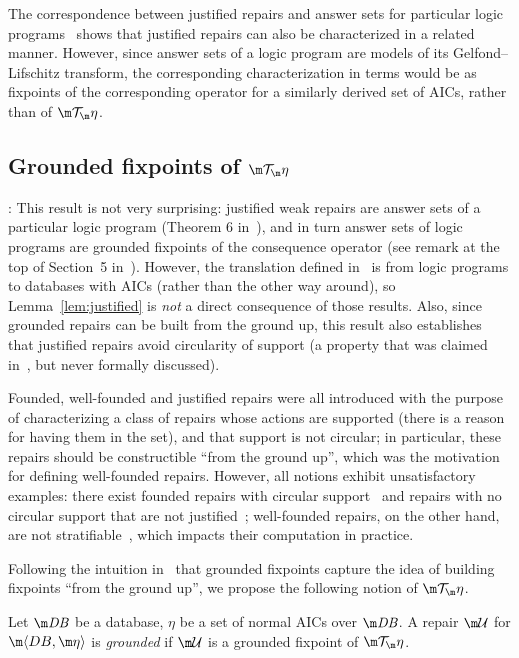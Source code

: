 The correspondence between justified repairs and answer sets for particular logic programs~\cite{Caroprese2011} shows that justified repairs can also be characterized in a related manner.
However, since answer sets of a logic program are models of its Gelfond--Lifschitz transform, the corresponding characterization in terms would be as fixpoints of the corresponding operator for a similarly derived set of AICs, rather than of $\Op$.

\subsection{Grounded fixpoints of $\Op$}

:
This result is not very surprising: justified weak repairs are answer sets of a particular logic program (Theorem 6 in~\cite{Caroprese2011}), and in turn answer sets of logic programs are grounded fixpoints of the consequence operator (see remark at the top of Section~5 in~).
However, the translation defined in~\cite{Caroprese2011} is from logic programs to databases with AICs (rather than the other way around), so Lemma~\ref{lem:justified} is \emph{not} a direct consequence of those results.
Also, since grounded repairs can be built from the ground up, this result also establishes that justified repairs avoid circularity of support (a property that was claimed in~\cite{Caroprese2011}, but never formally discussed).



Founded, well-founded and justified repairs were all introduced with the purpose of characterizing a class of repairs whose actions are supported (there is a reason for having them in the set), and that support is not circular; in particular, these repairs should be constructible ``from the ground up'', which was the motivation for defining well-founded repairs.
However, all notions exhibit unsatisfactory examples: there exist founded repairs with circular support~\cite{Caroprese2011} and repairs with no circular support that are not justified~\cite{CEGN13}; well-founded repairs, on the other hand, are not stratifiable~\cite{lcf:14}, which impacts their computation in practice.

Following the intuition in~ that grounded fixpoints capture the idea of building fixpoints ``from the ground up'', we propose the following notion of $\Op$.

\begin{definition}
  Let $\db$ be a database, $\eta$ be a set of normal AICs over $\db$.
  A repair $\UU$ for $\fulldb$ is \emph{grounded} if $\UU$ is a grounded fixpoint of $\Op$.
\end{definition}

